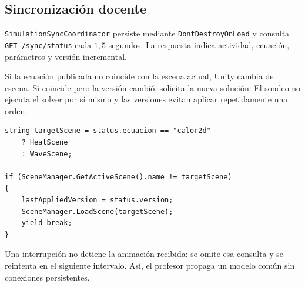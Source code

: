 \subsection{Sincronización docente}

\texttt{SimulationSyncCoordinator} persiste mediante \texttt{DontDestroyOnLoad} y
consulta \texttt{GET /sync/status} cada $1{,}5$ segundos. La respuesta indica actividad,
ecuación, parámetros y versión incremental.

Si la ecuación publicada no coincide con la escena actual, Unity cambia de escena. Si
coincide pero la versión cambió, solicita la nueva solución. El sondeo no ejecuta el
solver por sí mismo y las versiones evitan aplicar repetidamente una orden.

\begin{lstlisting}[style=csharp, caption={Cambio de escena sincronizado.}]
string targetScene = status.ecuacion == "calor2d"
    ? HeatScene
    : WaveScene;

if (SceneManager.GetActiveScene().name != targetScene)
{
    lastAppliedVersion = status.version;
    SceneManager.LoadScene(targetScene);
    yield break;
}
\end{lstlisting}

Una interrupción no detiene la animación recibida: se omite esa consulta y se reintenta
en el siguiente intervalo. Así, el profesor propaga un modelo común sin conexiones
persistentes.

